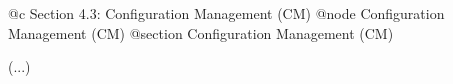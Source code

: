 @c Section 4.3: Configuration Management (CM)
@node Configuration Management (CM)
@section Configuration Management (CM)

(...)
